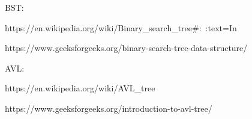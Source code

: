 BST:

https://en.wikipedia.org/wiki/Binary_search_tree#:~:text=In%

https://www.geeksforgeeks.org/binary-search-tree-data-structure/

AVL:

https://en.wikipedia.org/wiki/AVL_tree

https://www.geeksforgeeks.org/introduction-to-avl-tree/
